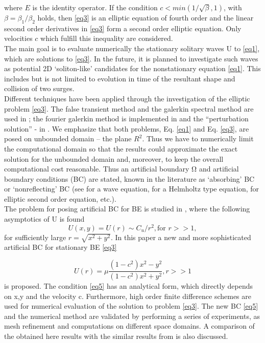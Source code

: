 \documentclass[12pt]{article}
\theoremstyle{theorem}
\theoremstyle{defi}
\begin{document}
where $E$ is the identity operator. If the condition  $c<min(1/\sqrt{\beta}, 1)$, with $\beta = \beta_1/\beta_2$ holds, then \eqref{eq3} is an elliptic equation of fourth order and the linear second order derivatives in \eqref{eq3} form a second order elliptic equation. Only velocities $c$ which fulfill this inequality are considered.
\\
 The main goal is to evaluate numerically the stationary solitary waves U to \eqref{eq1}, which are solutions to \eqref{eq3}. In the future, it is planned to investigate such waves as potential 2D  ‘soliton-like’ candidates for the nonstationary equation \eqref{eq1}. This includes but is not limited to evolution in time of the resultant shape and collision of two surges.
\\
Different techniques have been applied through the investigation of the elliptic problem \eqref{eq3}. The false transient method and the galerkin spectral method are used in \cite{ref6,ref9} ; the fourier galerkin method is implemented in \cite{ref8,ref9} and the “perturbation solution” - in \cite{ref10}.
We emphasize that both problems, Eq. \eqref{eq1} and Eq. \eqref{eq3}, are posed on unbounded domain – the plane $R^2$. Thus we have to numerically limit the computational domain so that the results could approximate the exact solution for the unbounded domain and, moreover, to keep the overall computational cost reasonable.
Thus an artificial boundary $Ω$ and artificial boundary conditions (BC) are stated, known in the literature as ‘absorbing’ BC or ‘nonreflecting’ BC (see \cite{ref11} for a wave equation, \cite{ref12} for a Helmholtz type equation, \cite{ref13} for elliptic second order equation, etc.). 
\\
The problem for posing artificial BC for BE is studied in \cite{ref6}, where the following asymptotics of U is found
\begin{equation}
U(x,y) = U(r) \sim  C_u/r^2, \text{for } r >> 1, \label{eq4}
\end{equation}
for sufficiently large $r=\sqrt{x^2 + y^2}$.
In this paper a new and more sophisticated artificial BC for stationary BE \eqref{eq3}

\begin{equation}
U(r) =  \mu \frac{(1-c^2)x^2 - y^2}{(1-c^2)x^2 + y^2}, r >> 1  \label{eq5}
\end{equation}
is proposed. The condition \eqref{eq5}  has an analytical form, which directly depends on x,y and the velocity c. Furthermore, high order finite difference schemes are used for numerical evaluation of the solution to problem \eqref{eq3}. The new BC \eqref{eq5} and the numerical method are validated by performing a series of experiments, as mesh refinement and computations on different space domains. A comparison of the obtained here results with the similar results from  \cite{ref10} is also discussed. 
\end{document}
